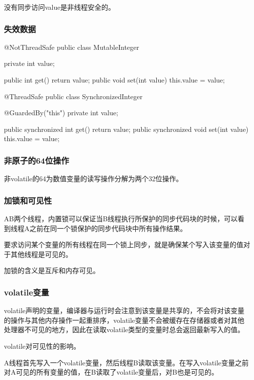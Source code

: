 没有同步访问value是非线程安全的。


\subsubsection{失效数据}

\begin{Java}
@NotThreadSafe
public class MutableInteger {
	private int value;
	
	public int get() {return value;}
	public void set(int value) { this.value = value;}
} 
\end{Java}


\begin{Java}[get和set必须同时设定为同步才能保证可见性]
@ThreadSafe
public class SynchronizedInteger {
	@GuardedBy("this") private int value;
	
	public synchronized int get() {return value;}
	public synchronized void set(int value) { this.value = value;}
}
\end{Java}


\subsubsection{非原子的64位操作}

非volatile的64为数值变量的读写操作分解为两个32位操作。

\subsubsection{加锁和可见性}

AB两个线程，内置锁可以保证当B线程执行所保护的同步代码块的时候，可以看到线程A之前在同一个锁保护的同步代码块中所有操作结果。

要求访问某个变量的所有线程在同一个锁上同步，就是确保某个写入该变量的值对于其他线程是可见的。

加锁的含义是互斥和内存可见。

\subsubsection{volatile变量}

volatile声明的变量，编译器与运行时会注意到该变量是共享的，不会将对该变量的操作与其他内存操作一起重排序，volatile变量不会被缓存在存储器或者对其他处理器不可见的地方，因此在读取volatile类型的变量时总会返回最新写入的值。


volatile对可见性的影响。

A线程首先写入一个volatile变量，然后线程B读取该变量。在写入volatile变量之前对A可见的所有变量的值，在B读取了volatile变量后，对B也是可见的。


